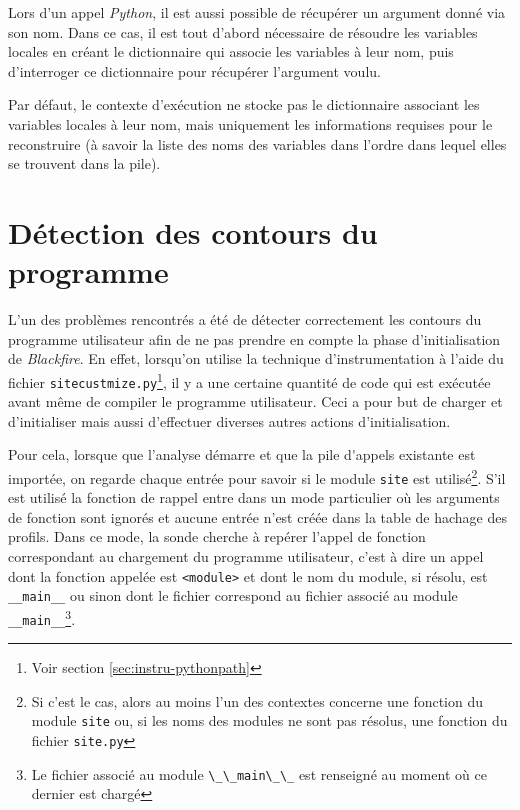 Lors d'un appel \emph{Python}, il est aussi possible de récupérer un argument donné via son nom. Dans ce cas, il est tout d'abord nécessaire de résoudre les variables locales en créant le dictionnaire qui associe les variables à leur nom, puis d'interroger ce dictionnaire pour récupérer l'argument voulu.

\begin{note}
Par défaut, le contexte d'exécution ne stocke pas le dictionnaire associant les variables locales à leur nom, mais uniquement les informations requises pour le reconstruire (à savoir la liste des noms des variables dans l'ordre dans lequel elles se trouvent dans la pile).
\end{note}

  \section{Détection des contours du programme}

L'un des problèmes rencontrés a été de détecter correctement les contours du \gls{programme utilisateur} afin de ne pas prendre en compte la phase d'initialisation de \emph{Blackfire}. En effet, lorsqu'on utilise la technique d'instrumentation à l'aide du fichier \verb|sitecustmize.py|\footnote{Voir section \vref{sec:instru-pythonpath}}, il y a une certaine quantité de code qui est exécutée avant même de compiler le programme utilisateur. Ceci a pour but de charger et d'initialiser \Blackfire mais aussi d'effectuer diverses autres actions d'initialisation.

Pour cela, lorsque que l'analyse démarre et que la \gls{pile d'appels} existante est importée, on regarde chaque entrée pour savoir si le module \verb|site| est utilisé\footnote{Si c'est le cas, alors au moins l'un des contextes concerne une fonction du module \verb?site? ou, si les noms des modules ne sont pas résolus, une fonction du fichier \verb?site.py?}. S'il est utilisé la fonction de rappel entre dans un mode particulier où les arguments de fonction sont ignorés et aucune entrée n'est créée dans la table de hachage des profils. Dans ce mode, la sonde cherche à repérer l'appel de fonction correspondant au chargement du programme utilisateur, c'est à dire un appel dont la fonction appelée est \verb|<module>| et dont le nom du module, si résolu, est \verb|__main__| ou sinon dont le fichier correspond au fichier associé au module \verb|__main__|\footnote{Le fichier associé au module \verb?\_\_main\_\_? est renseigné au moment où ce dernier est chargé}.


